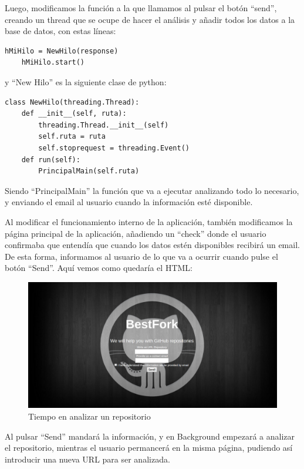 \documentclass[a4paper, 12pt]{book}
\begin{document}
Luego, modificamos la función a la que llamamos al pulsar el botón ``send'', creando un thread que se ocupe de hacer el análisis y añadir todos los datos a la base de datos, con estas líneas:
\lstset{language=python, breaklines=true, basicstyle=\footnotesize}
\begin{lstlisting}[frame=single]
    hMiHilo = NewHilo(response)
    hMiHilo.start()
\end{lstlisting}
\newpage
y ``New Hilo'' es la siguiente clase de python:
\lstset{language=python, breaklines=true, basicstyle=\footnotesize}
\begin{lstlisting}[frame=single]
class NewHilo(threading.Thread):
    def __init__(self, ruta):  
        threading.Thread.__init__(self) 
        self.ruta = ruta 
        self.stoprequest = threading.Event()
    def run(self):
        PrincipalMain(self.ruta)
\end{lstlisting}

Siendo ``PrincipalMain'' la función que va a ejecutar analizando todo lo necesario, y enviando el email al usuario cuando la información esté disponible.

Al modificar el funcionamiento interno de la aplicación, también modificamos la página principal de la aplicación, añadiendo un ``check'' donde el usuario confirmaba que entendía que cuando los datos estén disponibles recibirá un email. De esta forma, informamos al usuario de lo que va a ocurrir cuando pulse el botón ``Send''. Aquí vemos como quedaría el HTML:
\begin{figure}[H]
\centering
\includegraphics[scale=0.35]{img/threadppal.png} 
\caption{Tiempo en analizar un repositorio}
\end{figure}

Al pulsar ``Send'' mandará la información, y en Background empezará a analizar el repositorio, mientras el usuario permancerá en la misma página, pudiendo así introducir una nueva URL para ser analizada.
\end{document}
